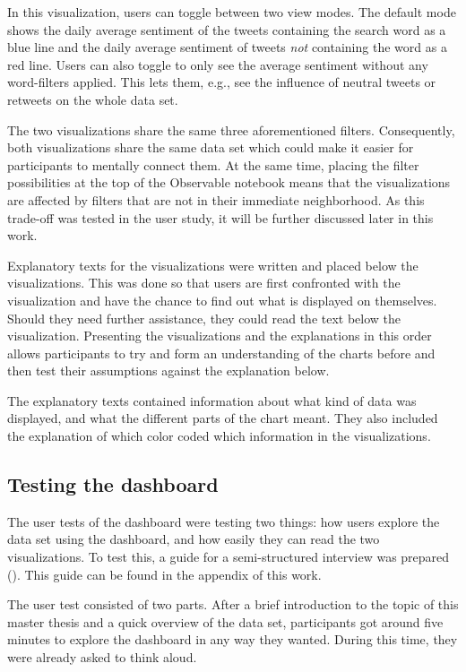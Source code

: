 In this visualization, users can toggle between two view modes. The default mode shows the daily average sentiment of the tweets containing the search word as a blue line and the daily average sentiment of tweets \emph{not} containing the word as a red line. Users can also toggle to only see the average sentiment without any word-filters applied. This lets them, e.g., see the influence of neutral tweets or retweets on the whole data set.

The two visualizations share the same three aforementioned filters. Consequently, both visualizations share the same data set which could make it easier for participants to mentally connect them. At the same time, placing the filter possibilities at the top of the Observable notebook means that the visualizations are affected by filters that are not in their immediate neighborhood. As this trade-off was tested in the user study, it will be further discussed later in this work.

Explanatory texts for the visualizations were written and placed below the visualizations. This was done so that users are first confronted with the visualization and have the chance to find out what is displayed on themselves. Should they need further assistance, they could read the text below the visualization. Presenting the visualizations and the explanations in this order allows participants to try and form an understanding of the charts before and then test their assumptions against the explanation below.

The explanatory texts contained information about what kind of data was displayed, and what the different parts of the chart meant. They also included the explanation of which color coded which information in the visualizations.

\subsection{Testing the dashboard}
The user tests of the dashboard were testing two things: how users explore the data set using the dashboard, and how easily they can read the two visualizations. To test this, a guide for a semi-structured interview was prepared (\cite[315ff.]{schnell1999methoden}). This guide can be found in the appendix of this work.

The user test consisted of two parts. After a brief introduction to the topic of this master thesis and a quick overview of the data set, participants got around five minutes to explore the dashboard in any way they wanted. During this time, they were already asked to think aloud.

